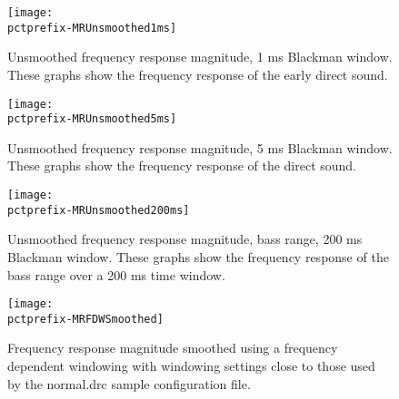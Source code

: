 \documentclass[a4paper,titlepage]{article}
\newcommand{\pctprefix}{T}
\newcommand{\pctwidth}{1.0}
\begin{document}
\clearpage


\begin{figure}
\begin{minipage}{\textwidth}
\begin{center}
\texttt{[image: \\pctprefix-MRUnsmoothed1ms]}
\caption{Unsmoothed frequency response  magnitude, 1 ms Blackman window.
These graphs show the frequency  response of the early direct sound.}
\end{center}
\end{minipage}

\begin{minipage}{\textwidth}
\begin{center}
\texttt{[image: \\pctprefix-MRUnsmoothed5ms]}
\caption{Unsmoothed frequency response  magnitude, 5 ms Blackman window.
These graphs show the frequency response of the direct sound.}
\end{center}
\end{minipage}
\end{figure}

\clearpage

\begin{figure}
\begin{minipage}{\textwidth}
\begin{center}
\texttt{[image: \\pctprefix-MRUnsmoothed200ms]}
\caption{Unsmoothed  frequency  response  magnitude, bass  range, 200 ms
Blackman window.  These graphs show  the frequency  response of the bass
range over a 200 ms time  window.}
\end{center}
\end{minipage}

\begin{minipage}{\textwidth}
\begin{center}
\texttt{[image: \\pctprefix-MRFDWSmoothed]}
\caption{Frequency    response  magnitude   smoothed  using a  frequency
dependent windowing with  windowing settings close  to those used by the
normal.drc sample configuration file.}
\end{center}
\end{minipage}
\end{figure}

\clearpage
\end{document}
